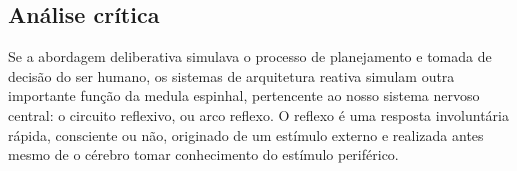 % 
% 
% 
% 

\subsection{Análise crítica}
Se a abordagem deliberativa simulava o processo de planejamento e tomada de
decisão do ser humano, os sistemas de arquitetura reativa simulam outra
importante função da medula espinhal, pertencente ao nosso sistema nervoso
central: o circuito reflexivo, ou arco reflexo. O reflexo é uma resposta
involuntária rápida, consciente ou não, originado de um estímulo externo e
realizada antes mesmo de o cérebro tomar conhecimento do estímulo periférico.



